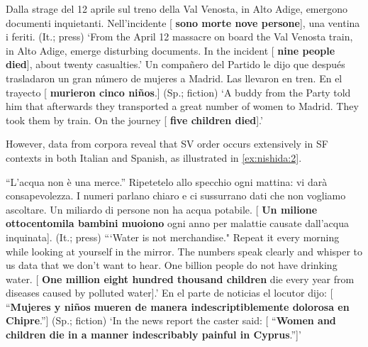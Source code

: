 \documentclass[output=paper,colorlinks,citecolor=brown,
]{langscibook}
\begin{document}
\begin{exe} %
    \ex\label{ex:nishida:1}
    \begin{xlist} %
        \ex\label{ex:nishida:1a} Dalla strage del 12 aprile sul treno della Val Venosta, in Alto Adige, emergono documenti 
	inquietanti. Nell’incidente [ \textbf{sono morte nove persone}], una ventina i feriti. (It.; press)
	\glt 	‘From the April 12 massacre on board the Val Venosta train, in Alto Adige, emerge 	disturbing documents. In the incident [ \textbf{nine people died}], about twenty casualties.’
        \ex\label{ex:nishida:1b} Un compañero del Partido le dijo que después trasladaron un gran número de mujeres a 
	Madrid. Las llevaron en tren. En el trayecto [ \textbf{murieron cinco niños}.] (Sp.; fiction)
	\glt ‘A buddy from the Party told him that afterwards they transported a great number of women 	to Madrid. They took them by train. On the journey [ \textbf{ five children died}].’ 
\end{xlist}
\end{exe}

However, data from corpora reveal that SV order occurs extensively in SF contexts in both Italian and Spanish, as illustrated in \ref{ex:nishida:2}.


\begin{exe} %
    \ex\label{ex:nishida:2} 
    \begin{xlist} 
        \ex\label{ex:nishida:2a} “L’acqua non è una merce.” Ripetetelo allo specchio ogni mattina: vi darà consapevolezza. I numeri parlano chiaro e ci sussurrano dati che non vogliamo 	ascoltare. Un miliardo di persone non ha acqua potabile. [ \textbf{Un milione ottocentomila 			bambini muoiono} ogni anno per malattie causate dall’acqua inquinata]. (It.; press)
        \glt ```Water is not merchandise." Repeat it every morning while looking at yourself in the 			mirror. The numbers speak clearly and whisper to us data that we don’t want to hear. One 		billion people do not have drinking water. [ \textbf{One million eight hundred thousand 				children} die every year from diseases caused by polluted water].'	
        \ex\label{ex:nishida:2b} En el parte de noticias el locutor dijo: [ “\textbf{Mujeres y niños mueren de manera					indescriptiblemente dolorosa en Chipre}.”] (Sp.; fiction)
        \glt ‘In the news report the caster said: [ “\textbf{Women and children die in a manner 					indescribably painful in Cyprus}.”]’   
          
\end{xlist}
\end{exe}
\end{document}
